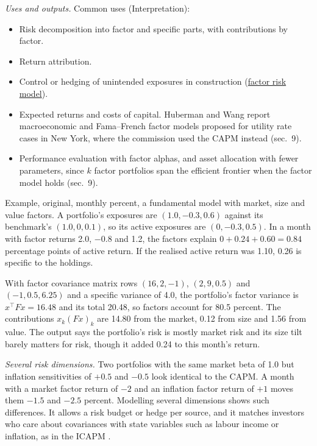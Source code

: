 \begin{qfdefinition}
 \emph{Uses and outputs.} Common uses (Interpretation):
\begin{itemize}
\item Risk decomposition into factor and specific parts, with contributions by factor.
\item Return attribution.
\item Control or hedging of unintended exposures in construction (\hyperref[mod:factor-risk-model]{factor risk model}).
\item Expected returns and costs of capital. Huberman and Wang report macroeconomic and Fama--French factor models proposed for utility rate cases in New York, where the commission used the CAPM instead (sec.~9).
\item Performance evaluation with factor alphas, and asset allocation with fewer parameters, since $k$ factor portfolios span the efficient frontier when the factor model holds (sec.~9).
\end{itemize}

Example, original, monthly percent, a fundamental model with market, size and value factors. A portfolio's exposures are $(1.0,-0.3,0.6)$ against its benchmark's $(1.0,0,0.1)$, so its active exposures are $(0,-0.3,0.5)$. In a month with factor returns 2.0, $-0.8$ and 1.2, the factors explain $0+0.24+0.60=0.84$ percentage points of active return. If the realised active return was 1.10, 0.26 is specific to the holdings.

With factor covariance matrix rows $(16,2,-1)$, $(2,9,0.5)$ and $(-1,0.5,6.25)$ and a specific variance of 4.0, the portfolio's factor variance is $x^\top Fx=16.48$ and its total 20.48, so factors account for 80.5 percent. The contributions $x_k(Fx)_k$ are 14.80 from the market, 0.12 from size and 1.56 from value. The output says the portfolio's risk is mostly market risk and its size tilt barely matters for risk, though it added 0.24 to this month's return.

\emph{Several risk dimensions.} Two portfolios with the same market beta of 1.0 but inflation sensitivities of $+0.5$ and $-0.5$ look identical to the CAPM. A month with a market factor return of $-2$ and an inflation factor return of $+1$ moves them $-1.5$ and $-2.5$ percent. Modelling several dimensions shows such differences. It allows a risk budget or hedge per source, and it matches investors who care about covariances with state variables such as labour income or inflation, as in the ICAPM \citep[\emph{JEP} 18(3), 2004, pp.~37--38]{capm-theory-evidence-2004}.


\end{qfdefinition}
